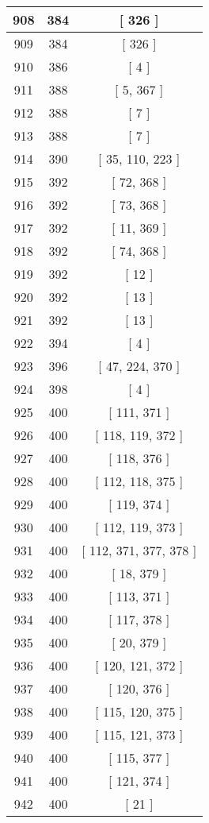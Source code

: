 \begin{center}
\begin{longtable}[H]{|| c c c ||}
908 & 384 & [ 326 ] \\ 
\hline
909 & 384 & [ 326 ] \\ 
\hline
910 & 386 & [ 4 ] \\ 
\hline
911 & 388 & [ 5, 367 ] \\ 
\hline
912 & 388 & [ 7 ] \\ 
\hline
913 & 388 & [ 7 ] \\ 
\hline
914 & 390 & [ 35, 110, 223 ] \\ 
\hline
915 & 392 & [ 72, 368 ] \\ 
\hline
916 & 392 & [ 73, 368 ] \\ 
\hline
917 & 392 & [ 11, 369 ] \\ 
\hline
918 & 392 & [ 74, 368 ] \\ 
\hline
919 & 392 & [ 12 ] \\ 
\hline
920 & 392 & [ 13 ] \\ 
\hline
921 & 392 & [ 13 ] \\ 
\hline
922 & 394 & [ 4 ] \\ 
\hline
923 & 396 & [ 47, 224, 370 ] \\ 
\hline
924 & 398 & [ 4 ] \\ 
\hline
925 & 400 & [ 111, 371 ] \\ 
\hline
926 & 400 & [ 118, 119, 372 ] \\ 
\hline
927 & 400 & [ 118, 376 ] \\ 
\hline
928 & 400 & [ 112, 118, 375 ] \\ 
\hline
929 & 400 & [ 119, 374 ] \\ 
\hline
930 & 400 & [ 112, 119, 373 ] \\ 
\hline
931 & 400 & [ 112, 371, 377, 378 ] \\ 
\hline
932 & 400 & [ 18, 379 ] \\ 
\hline
933 & 400 & [ 113, 371 ] \\ 
\hline
934 & 400 & [ 117, 378 ] \\ 
\hline
935 & 400 & [ 20, 379 ] \\ 
\hline
936 & 400 & [ 120, 121, 372 ] \\ 
\hline
937 & 400 & [ 120, 376 ] \\ 
\hline
938 & 400 & [ 115, 120, 375 ] \\ 
\hline
939 & 400 & [ 115, 121, 373 ] \\ 
\hline
940 & 400 & [ 115, 377 ] \\ 
\hline
941 & 400 & [ 121, 374 ] \\ 
\hline
942 & 400 & [ 21 ] \\ 

\end{longtable}
\end{center}
